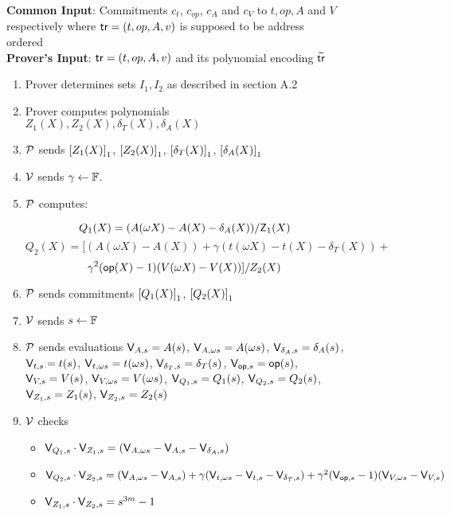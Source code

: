 \begin{figure}[htbp]

    \begin{mdframed}
    {
            {\bf Common Input}: Commitments $c_t$, $c_{op}$, $c_A$ and $c_V$ to $t,op,A$ and $V$ respectively where $\tr=(t, op, A, v)$ is supposed to be address ordered\\
    {\bf Prover's Input}: $\tr=(t, op, A, v)$ and its polynomial encoding $\wt{\tr}$
        \begin{enumerate}[leftmargin=1em, label=\arabic*]
            \item Prover determines sets $I_1, I_2$ as described in section A.2
            \item Prover computes polynomials $Z_1(X), Z_2(X), \delta_T(X), \delta_A(X)$
            \item $\prover$ sends $\gone{Z_1(X)}$, $\gone{Z_2(X)}$, $\gone{\delta_T(X)}$, $\gone{\delta_A(X)}$
            \item $\verifier$ sends $\gamma\gets \F$.
            \item $\prover$ computes:

            $$Q_1(X) =  (A(\omega X) - A(X) - \delta_A(X)) / \Z_1(X)$$
            $$Q_2(X) =  [(A(\omega X) - A(X))+\gamma(t(\omega X) - t(X) - \delta_T(X))+$$
            $$ \gamma^2 (\op(X) - 1)(V(\omega X) - V(X))] / Z_2(X) $$


            \item $\prover$ sends commitments $\gone{Q_1(X)}$, $\gone{Q_2(X)}$
            \item $\verifier$ sends $s\gets\F$
            \item $\prover$ sends evaluations $\val{s}{A}=A(s)$, $\val{\omega s}{A}=A(\omega s)$, $\val{s}{\delta_A} = \delta_A(s)$, $\val{s}{t}=t(s)$, $\val{\omega s}{t}=t(\omega s)$, $\val{s}{\delta_T} = \delta_T(s)$, $\val{s}{\op}=\op(s)$, $\val{s}{V}=V(s)$, $\val{\omega s}{V}=V(\omega s)$, $\val{s}{Q_1}=Q_1(s)$, $\val{s}{Q_2}=Q_2(s)$, $\val{s}{Z_1}=Z_1(s)$, $\val{s}{Z_2}=Z_2(s)$
            \item $\verifier$ checks
            \begin{itemize}
                \item $\val{s}{Q_1}\cdot \val{s}{Z_1} = (\val{\omega s}{A} - \val{s}{A} - \val{s}{\delta_A})$
                \item  $\val{s}{Q_2}\cdot \val{s}{Z_2} = (\val{\omega s}{A} - \val{s}{A})+\gamma (\val{\omega s}{t} - \val{s}{t} - \val{s}{\delta_T})+\gamma^2 (\val{s}{\op}-1)(\val{\omega s}{V} - \val{s}{V}) $
                \item $\val{s}{Z_1} \cdot \val{s}{Z_2}=s^{3m}-1$


\end{itemize}
\end{enumerate}}
\end{mdframed}
\end{figure}
